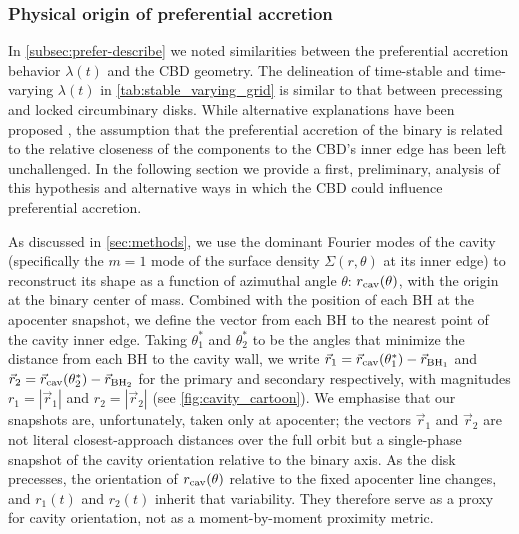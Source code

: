 \documentclass[fleqn,usenatbib]{mnras}
\begin{document}
\subsubsection{Physical origin of preferential accretion}\label{sec:preliminary_analysis}

In \autoref{subsec:prefer-describe} we noted similarities between the preferential accretion behavior $\lambda(t)$ and the CBD geometry. The delineation of time-stable and time-varying $\lambda(t)$ in \autoref{tab:stable_varying_grid} is similar to that between precessing and locked circumbinary disks. While alternative explanations have been proposed \citep{Artimowicz_83_og_polish}, the assumption that the preferential accretion of the binary is related to the relative closeness of the components to the CBD's inner edge \citep{dorazio_2013,Rafikov_16_accretion, farris_2014} has been left unchallenged. In the following section we provide a first, preliminary, analysis of this hypothesis and alternative ways in which the CBD could influence preferential accretion.



As discussed in \autoref{sec:methods}, we use the dominant Fourier modes of the cavity (specifically the $m=1$ mode of the surface density $\Sigma(r,\theta)$ at its inner edge) to reconstruct its shape as a function of azimuthal angle $\theta$: $r_{\rm cav}(\theta)$, with the origin at the binary center of mass. Combined with the position of each BH at the apocenter snapshot, we define the vector from each BH to the nearest point of the cavity inner edge. Taking $\theta_1^*$ and $\theta_2^*$ to be the angles that minimize the distance from each BH to the cavity wall, we write $\vec{r}_1 = \vec{r}_{\rm cav}(\theta_1^*) - \vec{r}_{\rm BH_1}$ and $\vec{r}_2 = \vec{r}_{\rm cav}(\theta_2^*) - \vec{r}_{\rm BH_2}$ for the primary and secondary respectively, with magnitudes $r_1 = |\vec{r}_1|$ and $r_2 = |\vec{r}_2|$ (see \autoref{fig:cavity_cartoon}). We emphasise that our snapshots are, unfortunately, taken only at apocenter; the vectors $\vec{r}_1$ and $\vec{r}_2$ are not literal closest-approach distances over the full orbit but a single-phase snapshot of the cavity orientation relative to the binary axis. As the disk precesses, the orientation of $r_{\rm cav}(\theta)$ relative to the fixed apocenter line changes, and $r_1(t)$ and $r_2(t)$ inherit that variability. They therefore serve as a proxy for cavity orientation, not as a moment-by-moment proximity metric.
\end{document}
